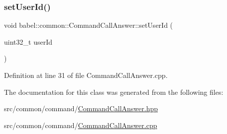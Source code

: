 \subsubsection{\texorpdfstring{set\+User\+Id()}{setUserId()}}
{\footnotesize\ttfamily void babel\+::common\+::\+Command\+Call\+Answer\+::set\+User\+Id (\begin{DoxyParamCaption}\item[{uint32\+\_\+t}]{user\+Id }\end{DoxyParamCaption})}



Definition at line 31 of file Command\+Call\+Answer.\+cpp.



The documentation for this class was generated from the following files\+:\begin{DoxyCompactItemize}
\item 
src/common/command/\mbox{\hyperlink{_command_call_answer_8hpp}{Command\+Call\+Answer.\+hpp}}\item 
src/common/command/\mbox{\hyperlink{_command_call_answer_8cpp}{Command\+Call\+Answer.\+cpp}}\end{DoxyCompactItemize}
